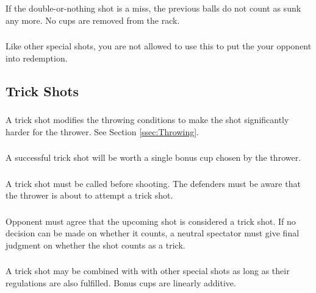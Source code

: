 		\subsubsection{}\label{ssec:DN,condition}
			If the double-or-nothing shot is a miss, the previous balls do not count as sunk any more.
            No cups are removed from the rack.
		\subsubsection{}\label{sssec:DN,redemption}
			Like other special shots, you are not allowed to use this to put the your opponent into redemption.

	\subsection{Trick Shots}\label{ssec:TrickShots}
        \subsubsection{}\label{sssec:trickShots,deff}
           A trick shot modifies the throwing conditions to make the shot significantly harder for the thrower.
           See Section \ref{ssec:Throwing}.
		\subsubsection{}\label{sssec:TrickShots,numofcups}
			A successful trick shot will be worth a single bonus cup chosen by the thrower.
		\subsubsection{}\label{sssec:TrickShots,calling}
			A trick shot must be called before shooting.
            The defenders must be aware that the thrower is about to attempt a trick shot.
		\subsubsection{}\label{sssec:TrickShot,agree}
			Opponent must agree that the upcoming shot is considered a trick shot.
            If no decision can be made on whether it counts, a neutral spectator must give final judgment on whether the shot counts as a trick.
		\subsubsection{}\label{sssec:TrickShot,combo}
			A trick shot may be combined with with other special shots as long as their regulations are also fulfilled.
            Bonus cups are linearly additive. 
